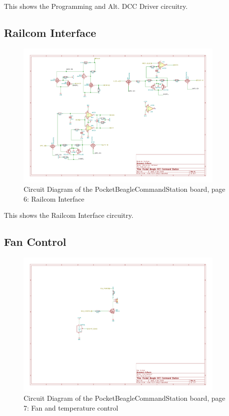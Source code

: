 This shows the Programming and Alt. DCC Driver circuitry.
\clearpage
\subsection{Railcom Interface}
\begin{figure}[hbpt]\begin{centering}%
\includegraphics[width=4in]{PocketBeagleCommandStation-6.pdf}
\caption{Circuit Diagram of the PocketBeagleCommandStation board, page 6: 
Railcom Interface}
\end{centering}\end{figure}

This shows the Railcom Interface circuitry.
\clearpage
\subsection{Fan Control}
\begin{figure}[hbpt]\begin{centering}%
\includegraphics[width=4in]{PocketBeagleCommandStation-7.pdf}
\caption{Circuit Diagram of the PocketBeagleCommandStation board, page 7: 
Fan and temperature control}
\end{centering}\end{figure}

